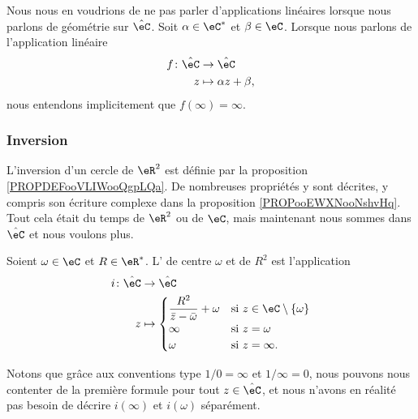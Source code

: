 Nous nous en voudrions de ne pas parler d'applications linéaires lorsque nous parlons de géométrie sur \( \hat \eC\). Soit \( \alpha\in \eC^*\) et \( \beta\in \eC\). Lorsque nous parlons de l'application linéaire
\begin{equation}
    \begin{aligned}
        f\colon \hat\eC&\to \hat\eC \\
        z&\mapsto \alpha z+\beta, 
    \end{aligned}
\end{equation}
nous entendons implicitement que \( f(\infty)=\infty\).

\subsubsection{Inversion}
\label{SSUBSooPOUNooTPilbE}

L'inversion d'un cercle de \( \eR^2\) est définie par la proposition \ref{PROPDEFooVLIWooQgpLQa}. De nombreuses propriétés y sont décrites, y compris son écriture complexe dans la proposition \ref{PROPooEWXNooNshvHq}. Tout cela était du temps de \( \eR^2\) ou de \( \eC\), mais maintenant nous sommes dans \( \hat \eC\) et nous voulons plus.

\begin{definition}       \label{DEFooIUTZooWRaXts}
    Soient \( \omega\in \eC\) et \( R\in \eR^*\). L' de centre \( \omega\) et de  \( R^2\) est l'application 
    \begin{equation}
        \begin{aligned}
            i\colon \hat \eC&\to \hat \eC \\
            z&\mapsto \begin{cases}
                \dfrac{ R^2 }{ \bar z-\bar \omega }+\omega    &   \text{si } z\in \eC\setminus\{ \omega \}\\
                 \infty   &    \text{si } z=\omega\\
                 \omega   &    \text{si } z=\infty.
            \end{cases}
        \end{aligned}
    \end{equation}
\end{definition}
Notons que grâce aux conventions type \( 1/0=\infty\) et \( 1/\infty=0\), nous pouvons nous contenter de la première formule pour tout \( z\in \hat \eC\), et nous n'avons en réalité pas besoin de décrire \( i(\infty)\) et \( i(\omega)\) séparément.

